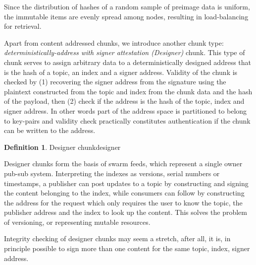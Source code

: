 \documentclass[a4paper,10pt,fullpage]{article}
\numberwithin{equation}{section}
\newcommand\gloss[1]{\emph{\gls{#1}}}
\theoremstyle{definition}
\newtheorem{definition}{Definition}[section]
\begin{document}
Since the distribution of hashes of a random sample of preimage data is uniform, the immutable items are evenly spread among nodes, resulting in load-balancing for retrieval. 

Apart from content addressed chunks, we introduce another chunk type:
\emph{deterministically-address with signer attestation (Designer)} chunk. This type of chunk serves to assign arbitrary data to a deterministically designed address that is the hash of a topic, an index and a signer address. Validity of the chunk is checked by (1) recovering the signer address from the signature using the plaintext constructed from the topic and index from the chunk data and the hash of the payload, then (2) check if the address is the hash of the topic, index and signer address.
In other words part of the address space is partitioned to belong to key-pairs and validity check practically constitutes authentication if the chunk can be written to the address. 

\begin{definition}{Designer chunk}\label{def:designer-chunk}
designer
\end{definition}

Designer chunks form the basis of swarm feeds, which represent a single owner pub-sub system. Interpreting the indexes as versions, serial numbers or timestamps, a publisher can post updates to a topic by constructing and signing the content belonging to the index, while consumers can follow by constructing the address for the request which only requires the user to know the topic, the publisher address and the index to look up the content. This solves the problem of versioning, or representing mutable resources. 

Integrity checking of designer chunks may seem a stretch, after all, it is, in principle possible to sign more than one content for the same topic, index, signer address.
\end{document}
